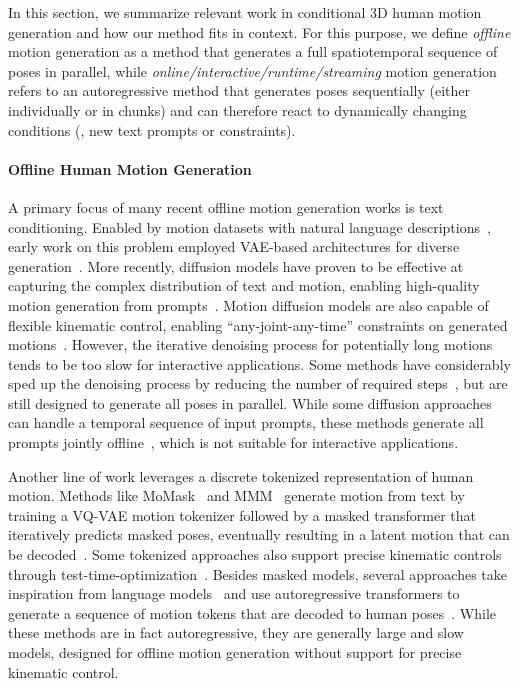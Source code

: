 In this section, we summarize relevant work in conditional 3D human motion generation and how our method fits in context. 
For this purpose, we define \textit{offline} motion generation as a method that generates a full spatiotemporal sequence of poses in parallel, while \textit{online/interactive/runtime/streaming} motion generation refers to an autoregressive method that generates poses sequentially (either individually or in chunks) and can therefore react to dynamically changing conditions (\eg, new text prompts or constraints).

\paragraph{Offline Human Motion Generation}
A primary focus of many recent offline motion generation works is text conditioning.
Enabled by motion datasets with natural language descriptions~\cite{plappert2016kit}, early work on this problem employed VAE-based architectures for diverse generation~\cite{petrovich22temos,guo2022humanml3d}.
More recently, diffusion models have proven to be effective at capturing the complex distribution of text and motion, enabling high-quality motion generation from prompts~\cite{tevet2023mdm,chen2023executing,zhang2024motiondiffuse}. 
Motion diffusion models are also capable of flexible kinematic control, enabling ``any-joint-any-time'' constraints on generated motions~\cite{xie2024omnicontrol,karunratanakul2024optimizing,karunratanakul2023gmd, Kimodo2026}. However, the iterative denoising process for potentially long motions tends to be too slow for interactive applications. Some methods have considerably sped up the denoising process by reducing the number of required steps~\cite{dai2025motionlcm,zhou2024emdm}, but are still designed to generate all poses in parallel. %
While some diffusion approaches can handle a temporal sequence of input prompts, these methods generate all prompts jointly offline~\cite{barquero2024flowmdm,petrovich24stmc,li2025unimotion}, which is not suitable for interactive applications. 

Another line of work leverages a discrete tokenized representation of human motion.
Methods like MoMask~\cite{guo2024momask} and MMM~\cite{pinyoanuntapong2024mmm} generate motion from text by training a VQ-VAE motion tokenizer followed by a masked transformer that iteratively predicts masked poses, eventually resulting in a latent motion that can be decoded~\cite{meng2025rethinking,pinyoanuntapong2024bamm}.
Some tokenized approaches also support precise kinematic controls through test-time-optimization~\cite{wan2024tlcontrol,pinyoanuntapong2025MaskControl}.
Besides masked models, several approaches take inspiration from language models~\cite{radford2018gpt} and use autoregressive transformers to generate a sequence of motion tokens that are decoded to human poses~\cite{zhang2023generating,jiang2024motiongpt,fan2025gotozero,lu2025scamo}. 
While these methods are in fact autoregressive, they are generally large and slow models, designed for offline motion generation without support for precise kinematic control.

